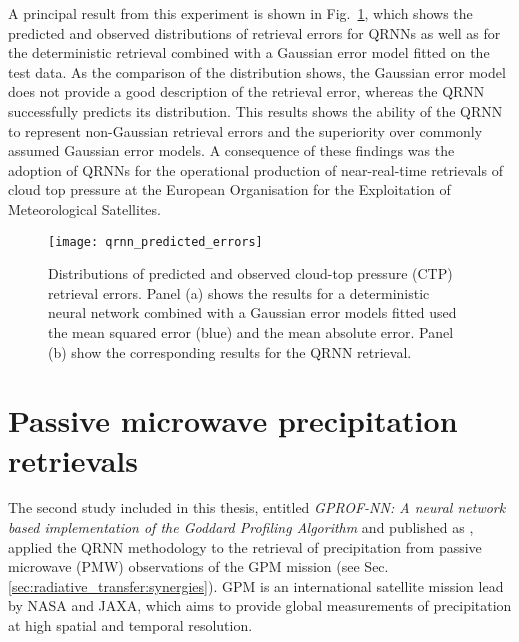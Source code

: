 A principal result from this experiment is shown in
Fig.~\ref{fig:contributions:qrnn_errors}, which shows the predicted and observed
distributions of retrieval errors for QRNNs as well as for the deterministic
retrieval combined with a Gaussian error model fitted on the test data. As the
comparison of the distribution shows, the Gaussian error model does not provide
a good description of the retrieval error, whereas the QRNN successfully
predicts its distribution. This results shows the ability of the QRNN to
represent non-Gaussian retrieval errors and the superiority over commonly
assumed Gaussian error models. A consequence of these findings was the adoption
of QRNNs for the operational production of near-real-time retrievals of cloud
top pressure at the European Organisation for the Exploitation of Meteorological
Satellites.

\begin{figure}
  \centering
  \texttt{[image: qrnn\_predicted\_errors]}
  \caption{Distributions of predicted and observed cloud-top pressure (CTP)
    retrieval errors. Panel (a) shows the results for a deterministic neural
    network combined with a Gaussian error models fitted used the mean squared
    error (blue) and the mean absolute error. Panel (b) show the
    corresponding results for the QRNN retrieval.}
  \label{fig:contributions:qrnn_errors}
\end{figure}

\section{Passive microwave precipitation retrievals}

The second study included in this thesis, entitled \textit{ GPROF-NN: A neural
  network based implementation of the Goddard Profiling Algorithm} and published
as \citet{pfreundschuh22a}, applied the QRNN methodology to the retrieval of
precipitation from passive microwave (PMW) observations of the GPM mission (see
Sec.\ref{sec:radiative_transfer:synergies}). GPM is an international satellite
mission lead by NASA and JAXA, which aims to provide global measurements of
precipitation at high spatial and temporal resolution.


